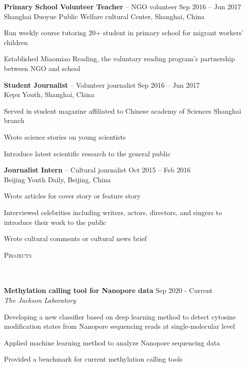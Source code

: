 \documentclass{article}
\newcommand{\header}[1]{{
\hspace*{-15pt}\vspace*{6pt} \textsc{#1}} \vspace*{-6pt} 
\lineunder
}
\newcommand{\lineunder}{
\vspace*{-8pt} \\ \hspace*{-18pt} 
\hrulefill \\
}
\newcommand{\employer}[4]{{
\vspace*{2pt}%
\textbf{#1} #2 \hfill #3\\ #4 \vspace*{2pt}}
}
\newcommand{\project}[4]{{
\vspace*{2pt}%
\textbf{#1} #2 \hfill #3\\ \textit{#4} \vspace*{2pt}}
}
\renewcommand{\labelitemii}{
$\vcenter{\hbox{\tiny$\bullet$}}$\hspace*{-3pt}
}
\newenvironment{bullet-list-minor}{
\begin{list}{\labelitemii}{\setlength\leftmargin{15pt} 
\topsep 0pt \itemsep -2pt}}{\vspace*{4pt}\end{list}
}
\begin{document}
    \employer{Primary School Volunteer Teacher}{-- NGO volunteer}{Sep 2016 -- Jun 2017}{Shanghai Duoyue Public Welfare cultural Center, Shanghai, China}
	\begin{bullet-list-minor}
	\item Run weekly course tutoring 20+ student in primary school for migrant workers' children 
    \item Established Miaomiao Reading, the voluntary reading program’s partnership between NGO and school 
    \end{bullet-list-minor}
    
    \employer{Student Journalist}{-- Volunteer journalist}{Sep 2016 -- Jun 2017}{Kepu Youth, Shanghai, China}
	\begin{bullet-list-minor}
	\item Served in student magazine affiliated to Chinese academy of Sciences Shanghai branch
	\item Wrote science stories on young scientists 
	\item Introduce latest scientific research to the general public  
    \end{bullet-list-minor}

    \employer{Journalist Intern}{-- Cultural journalist}{Oct 2015 -- Feb 2016}{Beijing Youth Daily, Beijing, China}
	\begin{bullet-list-minor}
	\item Wrote articles for cover story or feature story
	\item Interviewed celebrities including writers, actors, directors, and singers to introduce their work to the public  \item Wrote cultural comments or cultural news brief
    \end{bullet-list-minor}

\vspace*{4pt}%
\header{Projects}
    \project{Methylation calling tool for Nanopore data}{}{Sep 2020 - Current }{The Jackson Laboratory}
	\begin{bullet-list-minor}
	\item Developing a new classifier based on deep learning method to detect cytosine modification states from Nanopore sequencing reads at single-molecular level 
	\item Applied machine learning method to analyze Nanopore sequencing data
	\item Provided a benchmark for current methylation calling tools
    \end{bullet-list-minor}
\end{document}
